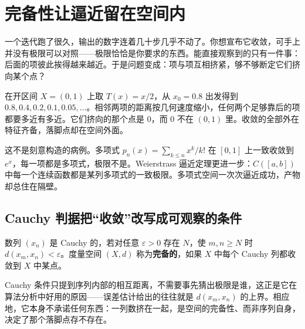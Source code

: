 \section{完备性让逼近留在空间内}
\label{sec:12-Real-Analysis-Support/03-Topology-Basics/03}

一个迭代跑了很久，输出的数字连着几十步几乎不动了。你想宣布它收敛，可手上并没有极限可以对照——极限恰恰是你要求的东西。能直接观察到的只有一件事：后面的项彼此挨得越来越近。于是问题变成：项与项互相挤紧，够不够断定它们挤向某个点？

在开区间 \(X=(0,1)\) 上取 \(T(x)=x/2\)，从 \(x_0=0.8\) 出发得到 \(0.8,0.4,0.2,0.1,0.05,\dots\)。相邻两项的距离按几何速度缩小，任何两个足够靠后的项都要多近有多近。它们挤向的那个点是 0，而 0 不在 \((0,1)\) 里。收敛的全部外在特征齐备，落脚点却在空间外面。

这不是刻意构造的病例。多项式 \(p_n(x)=\sum_{k\le n}x^k/k!\) 在 \([0,1]\) 上一致收敛到 \(e^x\)，每一项都是多项式，极限不是。Weierstrass 逼近定理更进一步：\(C([a,b])\) 中每一个连续函数都是某列多项式的一致极限。多项式空间一次次逼近成功，产物却总住在隔壁。

\subsection{Cauchy 判据把``收敛''改写成可观察的条件}

\begin{definition}
数列 \((x_n)\) 是 Cauchy 的，若对任意 \(\varepsilon>0\) 存在 \(N\)，使 \(m,n\ge N\) 时 \(d(x_m,x_n)<\varepsilon\)。度量空间 \((X,d)\) 称为\textbf{完备的}，如果 \(X\) 中每个 Cauchy 列都收敛到 \(X\) 中某点。
\end{definition}

Cauchy 条件只提到序列内部的相互距离，不需要事先猜出极限是谁，这正是它在算法分析中好用的原因——误差估计给出的往往就是 \(d(x_m,x_n)\) 的上界。相应地，它本身不承诺任何东西：一列数挤在一起，是空间的完备性、而非序列自身，决定了那个落脚点存不存在。

